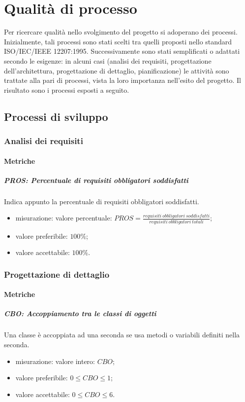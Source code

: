 \section{Qualità di processo}
Per ricercare qualità nello svolgimento del progetto si adoperano dei processi. Inizialmente, tali processi sono stati scelti tra quelli proposti nello standard ISO/IEC/IEEE 12207:1995. Successivamente sono stati semplificati o adattati secondo le esigenze: in alcuni casi (analisi dei requisiti, progettazione dell'architettura, progettazione di dettaglio, pianificazione) le attività sono trattate alla pari di processi, vista la loro importanza nell'esito del progetto.\newline 
Il risultato sono i processi esposti a seguito.

	\subsection{Processi di sviluppo}
	\subsubsection{Analisi dei requisiti}
		\paragraph{Metriche}
			\subparagraph{PROS: Percentuale di requisiti obbligatori soddisfatti} Indica appunto la percentuale di requisiti obbligatori soddisfatti.
			\begin{itemize}
				\item misurazione: valore percentuale: $ PROS = \frac{requisiti\ obbligatori\ soddisfatti}{requisiti\ obbligatori\ totali}$;
				\item valore preferibile: $100\%$;
				\item valore accettabile: $100\%$.
			\end{itemize}
			
	\subsubsection{Progettazione di dettaglio}
		\paragraph{Metriche}
			\subparagraph{CBO: Accoppiamento tra le classi di oggetti} 
			Una classe è accoppiata ad una seconda se usa metodi o variabili definiti nella seconda. 
			\begin{itemize}
				\item misurazione: valore intero: $CBO$;
				\item valore preferibile: $0 \leq CBO \leq 1$;
				\item valore accettabile: $0 \leq CBO \leq 6$.
			\end{itemize}
		
